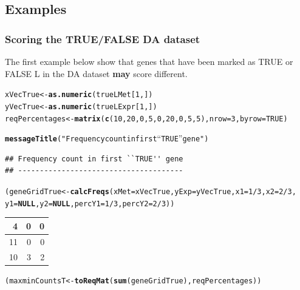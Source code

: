 \documentclass[a4paper,10pt]{article}\usepackage[]{graphicx}\usepackage[]{color}
\makeatletter
\newcommand{\hlnum}[1]{\textcolor[rgb]{0.686,0.059,0.569}{#1}}%
\newcommand{\hlstr}[1]{\textcolor[rgb]{0.192,0.494,0.8}{#1}}%
\newcommand{\hlopt}[1]{\textcolor[rgb]{0,0,0}{#1}}%
\newcommand{\hlstd}[1]{\textcolor[rgb]{0.345,0.345,0.345}{#1}}%
\newcommand{\hlkwa}[1]{\textcolor[rgb]{0.161,0.373,0.58}{\textbf{#1}}}%
\newcommand{\hlkwb}[1]{\textcolor[rgb]{0.69,0.353,0.396}{#1}}%
\newcommand{\hlkwc}[1]{\textcolor[rgb]{0.333,0.667,0.333}{#1}}%
\newcommand{\hlkwd}[1]{\textcolor[rgb]{0.737,0.353,0.396}{\textbf{#1}}}%
\newenvironment{kframe}{%
 \def\at@end@of@kframe{}%
 \ifinner\ifhmode%
  \def\at@end@of@kframe{\end{minipage}}%
  \begin{minipage}{\columnwidth}%
 \fi\fi%
 \def\FrameCommand##1{\hskip\@totalleftmargin \hskip-\fboxsep
 \colorbox{shadecolor}{##1}\hskip-\fboxsep
     \hskip-\linewidth \hskip-\@totalleftmargin \hskip\columnwidth}%
 \MakeFramed {\advance\hsize-\width
   \@totalleftmargin\z@ \linewidth\hsize
   \@setminipage}}%
 {\par\unskip\endMakeFramed%
 \at@end@of@kframe}
\newenvironment{knitrout}{}{} %
\makeatother
\begin{document}
\subsection{Examples}

\subsubsection{Scoring the TRUE/FALSE DA dataset}

The first example below show that genes that have been marked as TRUE or FALSE L in the DA dataset \textbf{may} score different.

\begin{knitrout}
\color{fgcolor}\begin{kframe}
\begin{alltt}
\hlstd{xVecTrue}\hlkwb{<-} \hlkwd{as.numeric}\hlstd{(trueLMet[}\hlnum{1}\hlstd{,])}
\hlstd{yVecTrue}\hlkwb{<-} \hlkwd{as.numeric}\hlstd{(trueLExpr[}\hlnum{1}\hlstd{,])}
\hlstd{reqPercentages} \hlkwb{<-} \hlkwd{matrix} \hlstd{(}\hlkwd{c}\hlstd{(}\hlnum{10}\hlstd{,} \hlnum{20}\hlstd{,} \hlnum{0}\hlstd{,} \hlnum{5}\hlstd{,} \hlnum{0}\hlstd{,} \hlnum{20}\hlstd{,} \hlnum{0}\hlstd{,} \hlnum{5}\hlstd{,} \hlnum{5}\hlstd{),} \hlkwc{nrow}\hlstd{=}\hlnum{3}\hlstd{,} \hlkwc{byrow}\hlstd{=}\hlnum{TRUE}\hlstd{)}

\hlkwd{messageTitle}\hlstd{(}\hlstr{"Frequency count in first ``TRUE'' gene"}\hlstd{)}
\end{alltt}
\begin{verbatim}
## Frequency count in first ``TRUE'' gene 
## --------------------------------------
\end{verbatim}
\begin{alltt}
\hlstd{(geneGridTrue} \hlkwb{<-} \hlkwd{calcFreqs}\hlstd{(}\hlkwc{xMet}\hlstd{=xVecTrue,} \hlkwc{yExp}\hlstd{=yVecTrue,} \hlkwc{x1}\hlstd{=}\hlnum{1}\hlopt{/}\hlnum{3}\hlstd{,} \hlkwc{x2}\hlstd{=}\hlnum{2}\hlopt{/}\hlnum{3}\hlstd{,}
                          \hlkwc{y1}\hlstd{=}\hlkwa{NULL}\hlstd{,} \hlkwc{y2}\hlstd{=}\hlkwa{NULL}\hlstd{,} \hlkwc{percY1}\hlstd{=}\hlnum{1}\hlopt{/}\hlnum{3}\hlstd{,} \hlkwc{percY2}\hlstd{=}\hlnum{2}\hlopt{/}\hlnum{3}\hlstd{))}
\end{alltt}
\end{kframe}


\begin{tabular}{r|r|r}
\hline
4 & 0 & 0\\
\hline
11 & 0 & 0\\
\hline
10 & 3 & 2\\
\hline
\end{tabular}\begin{kframe}\begin{alltt}
\hlstd{(maxminCountsT} \hlkwb{<-} \hlkwd{toReqMat} \hlstd{(}\hlkwd{sum}\hlstd{(geneGridTrue), reqPercentages))}
\end{alltt}
\end{kframe}



\end{knitrout}
\end{document}
